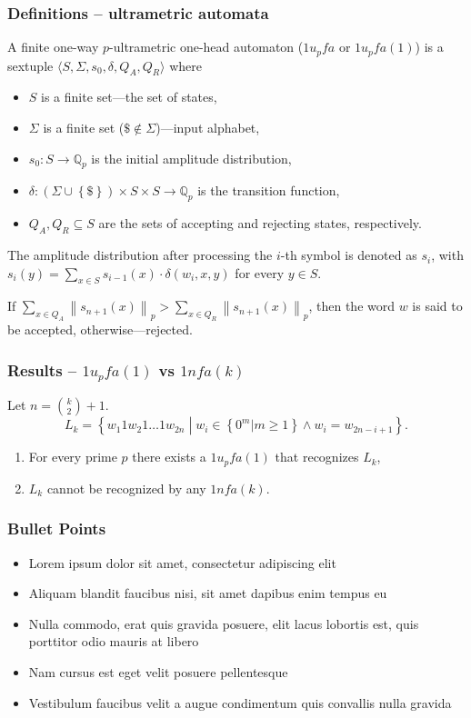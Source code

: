 \documentclass{beamer}
\begin{document}
\begin{frame}
\frametitle{Definitions -- ultrametric automata}
A finite one-way $p$-ultrametric one-head automaton  ($1\mathit{u_pfa}$ or $1\mathit{u_pfa}(1)$) is a sextuple
$\langle S, \Sigma, s_0, \delta, Q_A, Q_R \rangle$ where
\begin{itemize}
  \item $S$ is a finite set---the set of states,
  \item $\Sigma$ is a finite set ($\$ \notin \Sigma$)---input alphabet,
  \item $s_0:S \rightarrow \mathbb{Q}_p$ is the initial amplitude distribution,
  \item $\delta: \left( \Sigma \cup \left\{ \$ \right\} \right) \times S \times S \rightarrow \mathbb{Q}_p$ is the transition function,
  \item $Q_A, Q_R \subseteq S$ are the sets of accepting and rejecting states, respectively.
\end{itemize}

The amplitude distribution after processing the $i$-th symbol is denoted as $s_i$, with
$s_i(y) = \sum_{x \in S}{s_{i-1}(x) \cdot \delta \left( w_i, x, y \right) }$ for every $y \in S$.

If $\sum_{x \in Q_A}{\left\| s_{n+1}(x) \right\|_p} > \sum_{x \in Q_R}{\left\| s_{n+1}(x) \right\|_p}$, then the word $w$ is said to be accepted, otherwise---rejected.

\end{frame}
\begin{frame}
\frametitle{Results -- $1\mathit{u_pfa}(1)$ vs $1\mathit{nfa}(k)$}
Let $n={k\choose 2}+1$.
\[
L_k = \left\{ w_1 1 w_2 1 \ldots 1 w_{2n} \middle|
		w_i \in \left\{ 0^m | m \geq 1 \right\} \wedge
		w_i = w_{2n-i+1} 
		 \right\}.
\]

\begin{enumerate}
	\item For every prime $p$ there exists a $1\mathit{u_pfa}(1)$ that recognizes $L_k$,
	\item $L_k$ cannot be recognized by any $1\mathit{nfa}(k)$.
\end{enumerate}

\end{frame}

\begin{frame}
\frametitle{Bullet Points}
\begin{itemize}
\item Lorem ipsum dolor sit amet, consectetur adipiscing elit
\item Aliquam blandit faucibus nisi, sit amet dapibus enim tempus eu
\item Nulla commodo, erat quis gravida posuere, elit lacus lobortis est, quis porttitor odio mauris at libero
\item Nam cursus est eget velit posuere pellentesque
\item Vestibulum faucibus velit a augue condimentum quis convallis nulla gravida
\end{itemize}
\end{frame}
\end{document}
